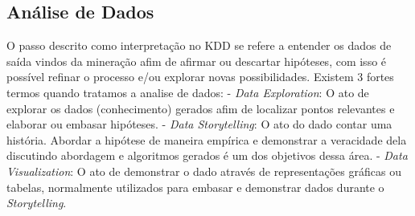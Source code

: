 \subsection{Análise de Dados}
O passo descrito como interpretação no KDD se refere a entender os dados de saída vindos da mineração afim de afirmar ou descartar hipóteses, com isso é possível refinar o processo e/ou explorar novas possibilidades. Existem 3 fortes termos quando tratamos a analise de dados:
- \textit{Data Exploration}: O ato de explorar os dados (conhecimento) gerados afim de localizar pontos relevantes e elaborar ou embasar hipóteses.
- \textit{Data Storytelling}: O ato do dado contar uma história. Abordar a hipótese de maneira empírica e demonstrar a veracidade dela discutindo abordagem e algoritmos gerados é um dos objetivos dessa área.
- \textit{Data Visualization}: O ato de demonstrar o dado através de representações gráficas ou tabelas, normalmente utilizados para embasar e demonstrar dados durante o \textit{Storytelling}.
